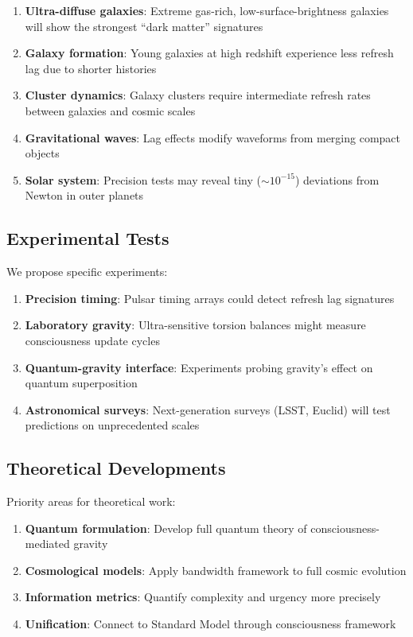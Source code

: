 \documentclass[twocolumn,prd,amsmath,amssymb,aps,superscriptaddress,nofootinbib]{revtex4-2}
\begin{document}
\begin{enumerate}
\item \textbf{Ultra-diffuse galaxies}: Extreme gas-rich, low-surface-brightness galaxies will show the strongest ``dark matter'' signatures
\item \textbf{Galaxy formation}: Young galaxies at high redshift experience less refresh lag due to shorter histories
\item \textbf{Cluster dynamics}: Galaxy clusters require intermediate refresh rates between galaxies and cosmic scales
\item \textbf{Gravitational waves}: Lag effects modify waveforms from merging compact objects
\item \textbf{Solar system}: Precision tests may reveal tiny ($\sim 10^{-15}$) deviations from Newton in outer planets
\end{enumerate}

\subsection{Experimental Tests}

We propose specific experiments:

\begin{enumerate}
\item \textbf{Precision timing}: Pulsar timing arrays could detect refresh lag signatures
\item \textbf{Laboratory gravity}: Ultra-sensitive torsion balances might measure consciousness update cycles
\item \textbf{Quantum-gravity interface}: Experiments probing gravity's effect on quantum superposition
\item \textbf{Astronomical surveys}: Next-generation surveys (LSST, Euclid) will test predictions on unprecedented scales
\end{enumerate}

\subsection{Theoretical Developments}

Priority areas for theoretical work:

\begin{enumerate}
\item \textbf{Quantum formulation}: Develop full quantum theory of consciousness-mediated gravity
\item \textbf{Cosmological models}: Apply bandwidth framework to full cosmic evolution
\item \textbf{Information metrics}: Quantify complexity and urgency more precisely
\item \textbf{Unification}: Connect to Standard Model through consciousness framework
\end{enumerate}
\end{document}
